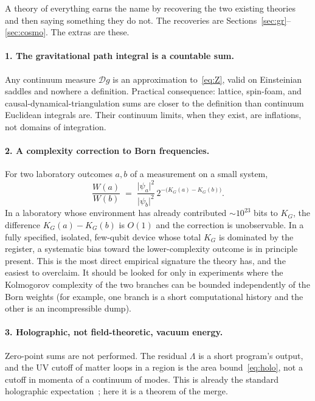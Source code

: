 \documentclass[11pt,a4paper]{article}
\theoremstyle{plain}
\theoremstyle{definition}
\theoremstyle{remark}
\newcommand{\KG}{K_{G}}
\newcommand{\abs}[1]{\lvert#1\rvert}
\begin{document}
A theory of everything earns the name by recovering the two existing theories and then saying something they do not.
The recoveries are Sections~\ref{sec:gr}--\ref{sec:cosmo}.
The extras are these.

\paragraph{1. The gravitational path integral is a countable sum.}
Any continuum measure $\mathcal{D}g$ is an approximation to~\eqref{eq:Z}, valid on Einsteinian saddles and nowhere a definition.
Practical consequence: lattice, spin-foam, and causal-dynamical-triangulation sums are closer to the definition than continuum Euclidean integrals are.
Their continuum limits, when they exist, are inflations, not domains of integration.

\paragraph{2. A complexity correction to Born frequencies.}
For two laboratory outcomes $a,b$ of a measurement on a small system,
\begin{equation}
  \frac{W(a)}{W(b)} \;=\; \frac{\abs{\psi_{a}}^{2}}{\abs{\psi_{b}}^{2}}\, 2^{-\bigl(\KG(a)-\KG(b)\bigr)}.
  \label{eq:born-corr}
\end{equation}
In a laboratory whose environment has already contributed $\sim 10^{23}$ bits to $\KG$, the difference $\KG(a)-\KG(b)$ is $O(1)$ and the correction is unobservable.
In a fully specified, isolated, few-qubit device whose total $\KG$ is dominated by the register, a systematic bias toward the lower-complexity outcome is in principle present.
This is the most direct empirical signature the theory has, and the easiest to overclaim.
It should be looked for only in experiments where the Kolmogorov complexity of the two branches can be bounded independently of the Born weights (for example, one branch is a short computational history and the other is an incompressible dump).

\paragraph{3. Holographic, not field-theoretic, vacuum energy.}
Zero-point sums are not performed.
The residual $\Lambda$ is a short program's output, and the UV cutoff of matter loops in a region is the area bound~\eqref{eq:holo}, not a cutoff in momenta of a continuum of modes.
This is already the standard holographic expectation~\cite{tHooft1993,bao2017}; here it is a theorem of the merge.
\end{document}
